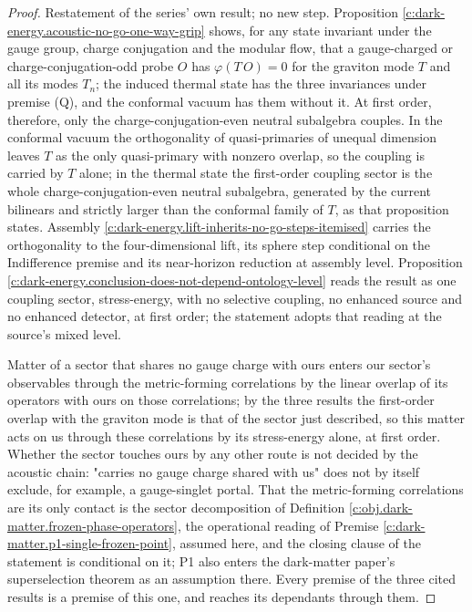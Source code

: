 \documentclass[11pt]{article}
\theoremstyle{definition}
\theoremstyle{plain}
\begin{document}
\begin{proof}
Restatement of the series' own result; no new step. Proposition \ref{c:dark-energy.acoustic-no-go-one-way-grip} shows, for any state invariant under the gauge group, charge conjugation and the modular flow, that a gauge-charged or charge-conjugation-odd probe $O$ has $\varphi(T\,O) = 0$ for the graviton mode $T$ and all its modes $T_{n}$; the induced thermal state has the three invariances under premise (Q), and the conformal vacuum has them without it. At first order, therefore, only the charge-conjugation-even neutral subalgebra couples. In the conformal vacuum the orthogonality of quasi-primaries of unequal dimension leaves $T$ as the only quasi-primary with nonzero overlap, so the coupling is carried by $T$ alone; in the thermal state the first-order coupling sector is the whole charge-conjugation-even neutral subalgebra, generated by the current bilinears and strictly larger than the conformal family of $T$, as that proposition states. Assembly \ref{c:dark-energy.lift-inherits-no-go-steps-itemised} carries the orthogonality to the four-dimensional lift, its sphere step conditional on the Indifference premise and its near-horizon reduction at assembly level. Proposition \ref{c:dark-energy.conclusion-does-not-depend-ontology-level} reads the result as one coupling sector, stress-energy, with no selective coupling, no enhanced source and no enhanced detector, at first order; the statement adopts that reading at the source's mixed level.

Matter of a sector that shares no gauge charge with ours enters our sector's observables through the metric-forming correlations by the linear overlap of its operators with ours on those correlations; by the three results the first-order overlap with the graviton mode is that of the sector just described, so this matter acts on us through these correlations by its stress-energy alone, at first order. Whether the sector touches ours by any other route is not decided by the acoustic chain: "carries no gauge charge shared with us" does not by itself exclude, for example, a gauge-singlet portal. That the metric-forming correlations are its only contact is the sector decomposition of Definition \ref{c:obj.dark-matter.frozen-phase-operators}, the operational reading of Premise \ref{c:dark-matter.p1-single-frozen-point}, assumed here, and the closing clause of the statement is conditional on it; P1 also enters the dark-matter paper's superselection theorem as an assumption there. Every premise of the three cited results is a premise of this one, and reaches its dependants through them.

\end{proof}
\end{document}
